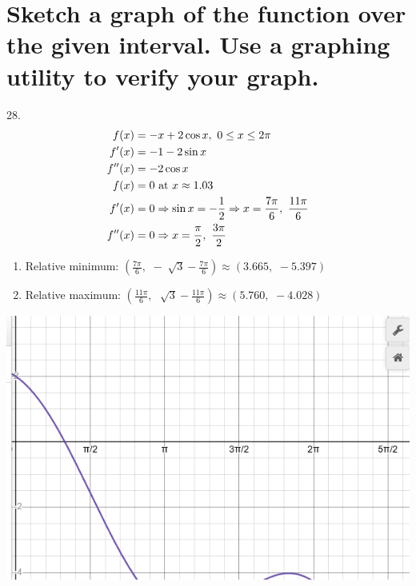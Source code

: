 \documentclass[11pt]{article}
\newcommand*{\set}{\setcounter{equation}{0}}
\begin{document}
\section{Sketch a graph of the function over the given interval. Use a graphing utility to verify your graph.}
28.\begin{align}
    \set
    f(x)&=-x+2\cos x,\,\,0\leq x\leq 2\pi\\
    f'(x)&=-1-2\sin x\\
    f''(x)&=-2\cos x\\
    f(x)&=0\,\,\text{at}\,\, x\approx 1.03\\
    f'(x)&=0\Rightarrow\sin x=-\frac{1}{2}\Rightarrow x=\frac{7\pi}{6},\,\,\frac{11\pi}{6}\\
    f''(x)&=0\Rightarrow x=\frac{\pi}{2},\,\,\frac{3\pi}{2}
\end{align}
\begin{enumerate}
    \item Relative minimum: $\left(\frac{7\pi}{6},\,\,-\sqrt[]{3}-\frac{7\pi}{6}\right)\approx\left(3.665,\,\,-5.397\right)$
    \item Relative maximum: $\left(\frac{11\pi}{6},\,\,\sqrt[]{3}-\frac{11\pi}{6}\right)\approx(5.760,\,\,-4.028)$
\end{enumerate}
\includegraphics{38.png}
\end{document}
